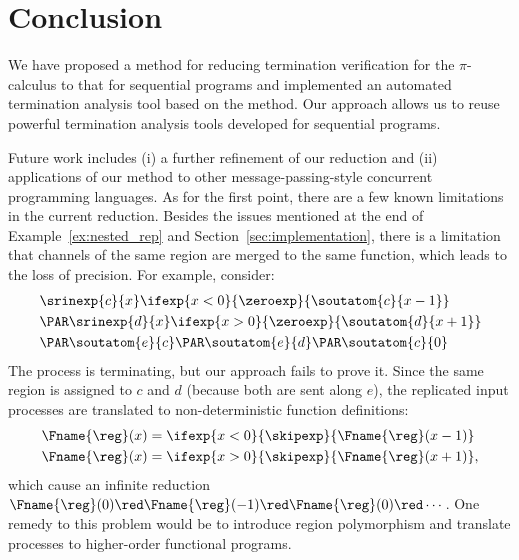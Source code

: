 \section{Conclusion}  \label{sec:conclusion}

We have proposed a method for reducing termination verification for
the \(\pi\)-calculus to that for sequential programs and implemented
an automated termination analysis tool based on the method.
Our approach allows us to reuse powerful termination analysis tools
developed for sequential programs.

Future work includes (i) a further refinement of our reduction
and (ii) applications of our method to other message-passing-style
concurrent programming languages.
As for the first point, there are a few known limitations in the current reduction.
Besides the issues mentioned at the end of Example~\ref{ex:nested_rep}
and Section~\ref{sec:implementation},
there is a limitation that channels of the same region are merged to the same function,
which leads to the loss of precision.
For example, consider:
\begin{align*}
  &\srinexp{c}{x} \ifexp{x < 0}{\zeroexp }{\soutatom{c}{x - 1}} \\
&  \PAR \srinexp{d}{x} \ifexp{x > 0}{\zeroexp }{\soutatom{d}{x + 1}} \\
&\PAR \soutatom{e}{c} \PAR \soutatom{e}{d} \PAR \soutatom{c}{0}
\end{align*}
The process is terminating, but our approach fails to prove it. Since the same region
is assigned to \(c\) and \(d\) (because both are sent along \(e\)), the replicated input processes
are translated to non-deterministic function definitions:
\begin{align*}
    \Fname{\reg}(x) &= \ifexp{x < 0}{\skipexp}{\Fname{\reg}(x - 1)} \\
    \Fname{\reg}(x) &= \ifexp{x > 0}{\skipexp}{\Fname{\reg}(x + 1)}, 
\end{align*}
which cause an infinite reduction \(\Fname{\reg}(0) \red \Fname{\reg}(-1)\red \Fname{\reg}(0)\red \cdots\).
One remedy to this problem would be to introduce region polymorphism and translate
processes to higher-order functional programs.
